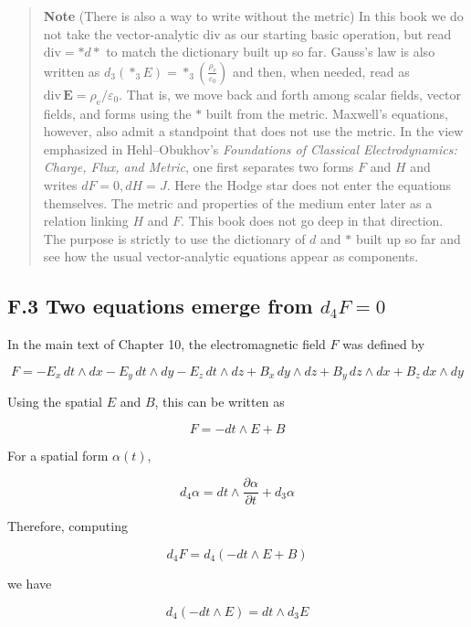\documentclass[a4paper,12pt,openany]{book}
\begin{document}
\begin{quote}
\textbf{Note} (There is also a way to write without the metric) In this
book we do not take the vector-analytic \(\mathrm{div}\) as our starting
basic operation, but read \(\mathrm{div}=\ast d\ast\) to match the
dictionary built up so far. Gauss's law is also written as
\(d_3(\ast_3E) = \ast_3\left(\frac{\rho_{\mathrm e}}{\varepsilon_0}\right)\)
and then, when needed, read as
\(\mathrm{div}\,\mathbf E=\rho_{\mathrm e}/\varepsilon_0\). That is, we
move back and forth among scalar fields, vector fields, and forms using
the \(\ast\) built from the metric. Maxwell's equations, however, also
admit a standpoint that does not use the metric. In the view emphasized
in Hehl–Obukhov's \emph{Foundations of Classical Electrodynamics:
Charge, Flux, and Metric}, one first separates two forms \(F\) and \(H\)
and writes \(dF=0, dH=J\). Here the Hodge star does not enter the
equations themselves. The metric and properties of the medium enter
later as a relation linking \(H\) and \(F\). This book does not go deep
in that direction. The purpose is strictly to use the dictionary of
\(d\) and \(\ast\) built up so far and see how the usual vector-analytic
equations appear as components.
\end{quote}

\hypertarget{f.3-two-equations-emerge-from-d_4f0}{%
\subsection*{\texorpdfstring{F.3 Two equations emerge from
\(d_4F=0\)}{F.3 Two equations emerge from d\_4F=0}}\label{f.3-two-equations-emerge-from-d_4f0}}

In the main text of Chapter 10, the electromagnetic field \(F\) was
defined by

\[
F=-E_x\,dt\wedge dx-E_y\,dt\wedge dy-E_z\,dt\wedge dz+B_x\,dy\wedge dz+B_y\,dz\wedge dx+B_z\,dx\wedge dy
\]

Using the spatial \(E\) and \(B\), this can be written as

\[
F=-dt\wedge E+B
\]

For a spatial form \(\alpha(t)\),

\[
d_4\alpha = dt\wedge\frac{\partial\alpha}{\partial t}+d_3\alpha
\]

Therefore, computing

\[
d_4F=d_4(-dt\wedge E+B)
\]

we have

\[
d_4(-dt\wedge E)=dt\wedge d_3E
\]
\end{document}
